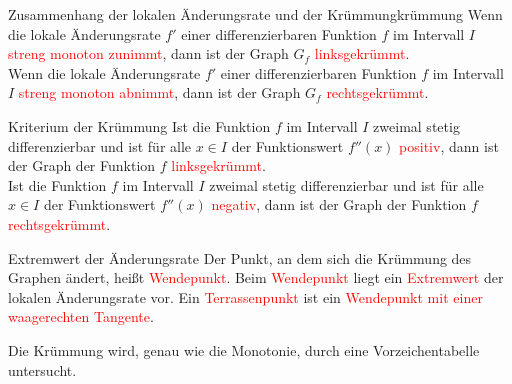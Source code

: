 \begin{satz}{Zusammenhang der lokalen Änderungsrate und der Krümmung}{krümmung}
  Wenn die lokale Änderungsrate $f'$ einer differenzierbaren Funktion $f$ im Intervall $I$ \textcolor{red}{streng monoton zunimmt}, dann ist der Graph $G_f$ \textcolor{red}{linksgekrümmt}.  \\
  Wenn die lokale Änderungsrate $f'$ einer differenzierbaren Funktion $f$ im Intervall $I$ \textcolor{red}{streng monoton abnimmt}, dann ist der Graph $G_f$ \textcolor{red}{rechtsgekrümmt}. 
\end{satz}
\begin{satz}{Kriterium der Krümmung}{}
Ist die Funktion $f$ im Intervall $I$ zweimal stetig differenzierbar und ist für alle $x\in I$ der Funktionswert $f''(x)$ \textcolor{red}{positiv}, dann ist der Graph der Funktion $f$ \textcolor{red}{linksgekrümmt}.\\
Ist die Funktion $f$ im Intervall $I$ zweimal stetig differenzierbar und ist für alle $x\in I$ der Funktionswert $f''(x)$ \textcolor{red}{negativ}, dann ist der Graph der Funktion $f$ \textcolor{red}{rechtsgekrümmt}.

\end{satz}
\begin{bem}{Extremwert der Änderungsrate}{}
Der Punkt, an dem sich die Krümmung des Graphen ändert, heißt \textcolor{red}{Wendepunkt}. Beim \textcolor{red}{Wendepunkt} liegt ein \textcolor{red}{Extremwert} der lokalen Änderungsrate vor. Ein \textcolor{red}{Terrassenpunkt} ist ein \textcolor{red}{Wendepunkt mit einer waagerechten Tangente}.
\end{bem}
Die Krümmung wird, genau wie die Monotonie, durch eine Vorzeichentabelle untersucht.  
